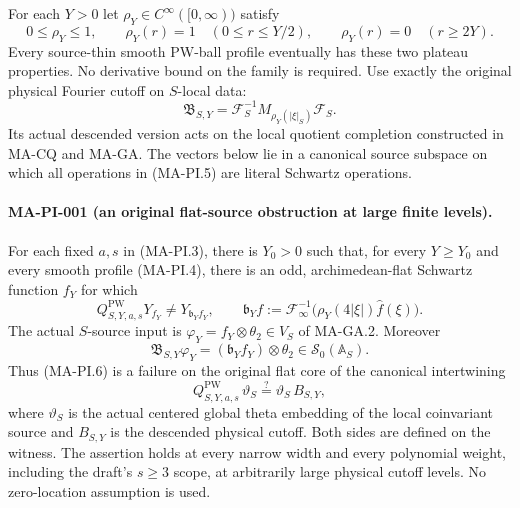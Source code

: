 For each $Y>0$ let $\rho_Y\in C^\infty([0,\infty))$ satisfy
\[
 0\leq\rho_Y\leq1,\qquad
 \rho_Y(r)=1\quad(0\leq r\leq Y/2),\qquad
 \rho_Y(r)=0\quad(r\geq2Y).
 \tag{MA-PI.4}
\]
Every source-thin smooth PW-ball profile eventually has
these two plateau properties.  No derivative bound on the
family is required.  Use exactly the original physical
Fourier cutoff on $S$-local data:
\[
 \mathfrak B_{S,Y}
       =\mathcal F_S^{-1}M_{\rho_Y(|\xi|_S)}\mathcal F_S.
 \tag{MA-PI.5}
\]
Its actual descended version acts on the local quotient
completion constructed in MA-CQ and MA-GA.  The vectors
below lie in a canonical source subspace on which all
operations in (MA-PI.5) are literal Schwartz operations.

\paragraph{MA-PI-001 (an original flat-source obstruction at large finite levels).}
For each fixed $a,s$ in (MA-PI.3), there is $Y_0>0$ such
that, for every $Y\geq Y_0$ and every smooth profile
(MA-PI.4), there is an odd, archimedean-flat Schwartz
function $f_Y$ for which
\[
 Q^{\mathrm{PW}}_{S,Y,a,s}Y_{f_Y}
              \ne Y_{\mathfrak b_Y f_Y},
 \qquad
 \mathfrak b_Y f
     :=\mathcal F_\infty^{-1}
          \bigl(\rho_Y(4|\xi|)\widehat f(\xi)\bigr).
 \tag{MA-PI.6}
\]
The actual $S$-source input is
$\varphi_Y=f_Y\otimes\theta_2\in V_S$ of MA-GA.2.
Moreover
\[
 \mathfrak B_{S,Y}\varphi_Y
           =(\mathfrak b_Y f_Y)\otimes\theta_2
                         \in\mathcal S_0(\mathbb A_S).
 \tag{MA-PI.7}
\]
Thus (MA-PI.6) is a failure on the original flat core of
the canonical intertwining
\[
 Q^{\mathrm{PW}}_{S,Y,a,s}\,\vartheta_S
                 \stackrel{?}{=}\vartheta_S\,B_{S,Y},
 \tag{MA-PI.8}
\]
where $\vartheta_S$ is the actual centered global theta
embedding of the local coinvariant source and $B_{S,Y}$
is the descended physical cutoff.  Both sides are defined
on the witness.  The assertion holds at every narrow
width and every polynomial weight, including the draft's
$s\geq3$ scope, at arbitrarily large physical cutoff levels.
No zero-location assumption is used.


